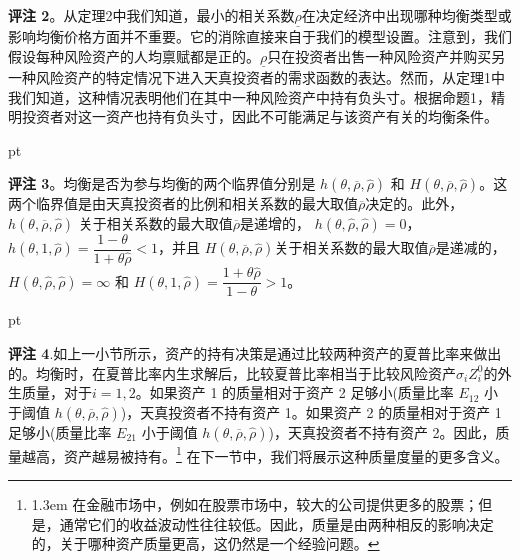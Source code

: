 \documentclass[10.0pt]{article}
\newcommand{\hhred}{\textcolor{red}}
\begin{document}
{\bf 评注 2}。从定理2中我们知道，最小的相关系数$\underline{\rho}$在决定经济中出现哪种均衡类型或影响均衡价格方面并不重要。它的消除直接来自于我们的模型设置。注意到，我们假设每种风险资产的人均禀赋都是正的。$\underline{\rho}$只在投资者出售一种风险资产并购买另一种风险资产的特定情况下进入天真投资者的需求函数的表达。然而，从定理1中我们知道，这种情况表明他们在其中一种风险资产中持有负头寸。根据命题1，精明投资者对这一资产也持有负头寸，因此不可能满足与该资产有关的均衡条件。

 pt



{\bf 评注 3}。均衡是否为参与均衡的两个临界值分别是 $ h (\theta, \overline{\rho}, {\hat \rho}) $ 和 $ H (\theta, \overline{\rho}, {\hat \rho}) $。这两个临界值是由天真投资者的比例和相关系数的最大取值$\overline{\rho}$决定的。此外，$ h (\theta, \overline{\rho}, {\hat \rho}) $ 关于相关系数的最大取值$\overline{\rho}$是递增的， $ h (\theta, {\hat \rho}, {\hat \rho}) = 0 $， $ h (\theta, 1, {\hat \rho}) = \dfrac{1 - \theta}{1 + \theta {\hat \rho}} < 1 $，并且 $ H (\theta, \overline{\rho}, {\hat \rho}) $关于相关系数的最大取值$\overline{\rho}$是递减的， $ H (\theta, {\hat \rho}, {\hat \rho}) = \infty $ 和 $ H (\theta, 1, {\hat \rho}) = \dfrac{1 + \theta {\hat \rho}}{1 - \theta} > 1 $。



 pt




{\bf 评注 4}.如上一小节所示，资产的持有决策是通过比较两种资产的夏普比率来做出的。均衡时，在夏普比率内生求解后，比较夏普比率相当于比较风险资产$\sigma_i Z_i^0$的外生质量，对于$i=1,2$。如果资产 1 的质量相对于资产 2 足够小(质量比率 $ E_{12} $ 小于阈值 $ h (\theta, \overline{\rho}, {\hat \rho}) $)，天真投资者不持有资产 1。如果资产 2 的质量相对于资产 1 足够小(质量比率 $ E_{21} $ 小于阈值 $ h (\theta, \overline{ \rho}, {\hat \rho}) $)，天真投资者不持有资产 2。因此，质量越高，资产越易被持有。\footnote{\baselineskip1.3em 在金融市场中，例如在股票市场中，较大的公司提供更多的股票；但是，通常它们的收益波动性往往较低。因此，质量是由两种相反的影响决定的，关于哪种资产质量更高，这仍然是一个经验问题。} 在下一节中，我们将展示这种质量度量的更多含义。
\end{document}
